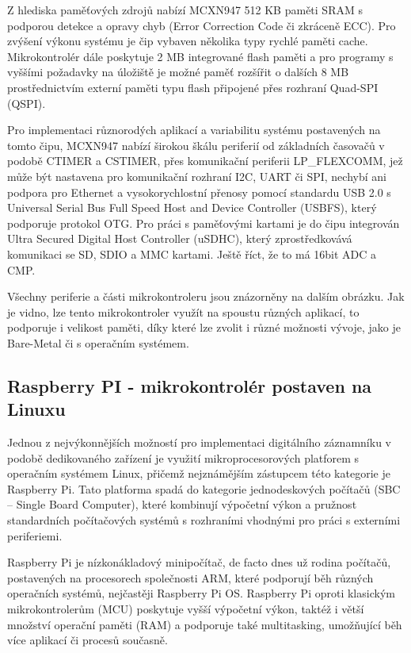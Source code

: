 Z hlediska paměťových zdrojů nabízí MCXN947 512 KB paměti SRAM s podporou detekce a opravy chyb (Error Correction Code či zkráceně ECC). Pro zvýšení výkonu systému je čip vybaven několika typy rychlé paměti cache. Mikrokontrolér dále poskytuje 2 MB integrované flash paměti a pro programy s vyššími požadavky na úložiště je možné paměť rozšířit o dalších 8 MB prostřednictvím externí paměti typu flash připojené přes rozhraní Quad-SPI (QSPI). \cite{nxp_MCX_Nx4x_Reference_Manual}

Pro implementaci různorodých aplikací a variabilitu systému postavených na tomto čipu, MCXN947 nabízí širokou škálu periferií od základních časovačů v podobě CTIMER a CSTIMER, přes komunikační periferii LP\_FLEXCOMM, jež může být nastavena pro komunikační rozhraní I2C, UART či SPI, nechybí ani podpora pro Ethernet a vysokorychlostní přenosy pomocí standardu USB 2.0 s Universal Serial Bus Full Speed Host and Device Controller (USBFS), který podporuje protokol OTG. Pro práci s paměťovými kartami je do čipu integrován Ultra Secured Digital Host Controller (uSDHC), který zprostředkovává komunikaci se SD, SDIO a MMC kartami. Ještě říct, že to má 16bit ADC a CMP. \cite{nxp_MCX_Nx4x_Reference_Manual}

Všechny periferie a části mikrokontroleru jsou znázorněny na dalším obrázku. Jak je vidno, lze tento mikrokontroler využít na spoustu různých aplikací, to podporuje i velikost paměti, díky které lze zvolit i různé možnosti vývoje, jako je Bare-Metal či s operačním systémem. 


\subsection{Raspberry PI - mikrokontrolér postaven na Linuxu}
Jednou z nejvýkonnějších možností pro implementaci digitálního záznamníku v podobě dedikovaného zařízení je využití mikroprocesorových platforem s operačním systémem Linux, přičemž nejznámějším zástupcem této kategorie je Raspberry Pi. Tato platforma spadá do kategorie jednodeskových počítačů (SBC – Single Board Computer), které kombinují výpočetní výkon a pružnost standardních počítačových systémů s rozhraními vhodnými pro práci s externími periferiemi.

Raspberry Pi je nízkonákladový minipočítač, de facto dnes už rodina počítačů, postavených na procesorech společnosti ARM, které podporují běh různých operačních systémů, nejčastěji Raspberry Pi OS. Raspberry Pi oproti klasickým mikrokontrolerům (MCU) poskytuje vyšší výpočetní výkon, taktéž i větší množství operační paměti (RAM) a podporuje také multitasking, umožňující běh více aplikací či procesů současně.

